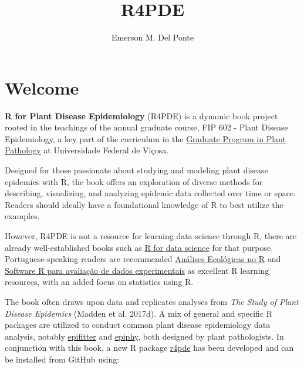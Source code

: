 \documentclass[
  letterpaper,
  DIV=11,
  numbers=noendperiod]{scrreprt}
\title{R4PDE}
\author{Emerson M. Del Ponte}
\date{}
\renewcommand*\contentsname{Table of contents}
\newcommand\contentsname{Table of contents}
\begin{document}
\maketitle
\ifdefined\Shaded\renewenvironment{Shaded}{\begin{tcolorbox}[frame hidden, breakable, interior hidden, borderline west={3pt}{0pt}{shadecolor}, enhanced, sharp corners, boxrule=0pt]}{\end{tcolorbox}}\fi

\renewcommand*\contentsname{Table of contents}
{
\hypersetup{linkcolor=}
\setcounter{tocdepth}{2}
\tableofcontents
}

\hypertarget{welcome}{%
\chapter*{Welcome}\label{welcome}}


\textbf{R for Plant Disease Epidemiology} (R4PDE) is a dynamic book
project rooted in the teachings of the annual graduate course, FIP 602 -
Plant Disease Epidemiology, a key part of the curriculum in the
\href{http://www.dfp.ufv.br/grad/}{Graduate Program in Plant Pathology}
at Universidade Federal de Viçosa.

Designed for those passionate about studying and modeling plant disease
epidemics with R, the book offers an exploration of diverse methods for
describing, visualizing, and analyzing epidemic data collected over time
or space. Readers should ideally have a foundational knowledge of R to
best utilize the examples.

However, R4PDE is not a resource for learning data science through R,
there are already well-established books such as
\href{https://r4ds.had.co.nz/}{R for data science} for that purpose.
Portuguese-speaking readers are recommended
\href{https://analises-ecologicas.netlify.app/}{Análises Ecológicas no
R} and \href{https://tiagoolivoto.github.io/e-bookr/index.html}{Software
R para avaliação de dados experimentais} as excellent R learning
resources, with an added focus on statistics using R.

The book often draws upon data and replicates analyses from \emph{The
Study of Plant Disease Epidemics} (Madden et al. 2017d). A mix of
general and specific R packages are utilized to conduct common plant
disease epidemiology data analysis, notably
\href{https://alvesks.github.io/epifitter/}{epifitter} and
\href{https://chgigot.github.io/epiphy/}{epiphy}, both designed by plant
pathologists. In conjunction with this book, a new R package
\href{https://github.com/emdelponte/r4pde}{r4pde} has been developed and
can be installed from GitHub using:
\end{document}
